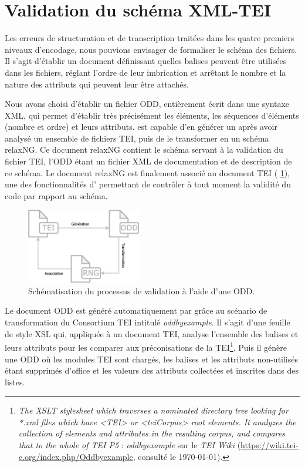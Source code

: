 \section{Validation du schéma XML-TEI}

Les erreurs de structuration et de transcription traitées dans les quatre premiers niveaux d'encodage, nous pouvions envisager de formaliser le schéma des fichiers. Il s'agit d'établir un document définissant quelles balises peuvent être utilisées dans les fichiers, réglant l'ordre de leur imbrication et arrêtant le nombre et la nature des attributs qui peuvent leur être attachés.

Nous avons choisi d'établir un fichier ODD, entièrement écrit dans une syntaxe XML, qui permet d'établir très précisément les éléments, les séquences d'éléments (nombre et ordre) et leurs attributs. \oxygen{} est capable d'en générer un après avoir analysé un ensemble de fichiers TEI, puis de le transformer en un schéma relaxNG. Ce document relaxNG contient le schéma servant à la validation du fichier TEI, l'ODD étant un fichier XML de documentation et de description de ce schéma. Le document relaxNG est finalement associé au document TEI (\fig{} \ref{fig:tei-odd-rng}), une des fonctionnalités d'\oxygen{} permettant de contrôler à tout moment la validité du code par rapport au schéma.

\begin{figure}[ht]
    \centering
    \includegraphics[width=5cm]{img/tei-odd-rng.png}
    \caption{Schématisation du processus de validation à l'aide d'une ODD.}
    \label{fig:tei-odd-rng}
\end{figure}

Le document ODD est généré automatiquement par \oxygen{} grâce au scénario de transformation du Consortium TEI intitulé \textit{oddbyexample}. Il s'agit d'une feuille de style XSL qui, appliquée à un document TEI, analyse l'ensemble des balises et leurs attributs pour les comparer aux préconisations de la TEI\footnote{\textit{The XSLT stylesheet which traverses a nominated directory tree looking for *.xml files which have <TEI> or <teiCorpus> root elements. It analyzes the collection of elements and attributes in the resulting corpus, and compares that to the whole of TEI P5} : \textit{oddbyexample} sur le \textit{TEI Wiki} (\url{https://wiki.tei-c.org/index.php/Oddbyexample}, consulté le \today).}. Puis il génère une ODD où les modules TEI sont chargés, les balises et les attributs non-utilisés étant supprimés d'office et les valeurs des attributs collectées et inscrites dans des listes.

